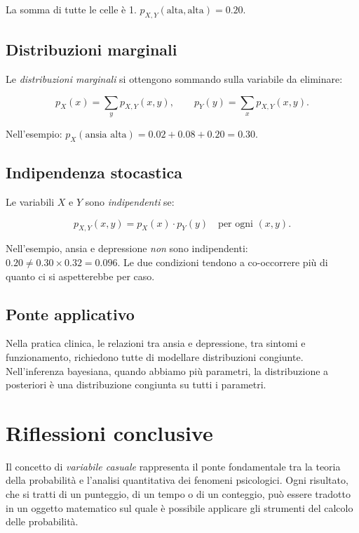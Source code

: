 \documentclass[
  italian,
  letterpaper,
  a4paper,
  11pt,
  open=any]{scrbook}
\theoremstyle{plain}
\theoremstyle{definition}
\theoremstyle{definition}
\theoremstyle{remark}
\begin{document}
La somma di tutte le celle è 1.
\(p_{X,Y}(\text{alta}, \text{alta}) = 0.20\).

\subsection{Distribuzioni marginali}\label{distribuzioni-marginali}

Le \emph{distribuzioni marginali} si ottengono sommando sulla variabile
da eliminare:

\[
p_X(x) = \sum_y p_{X,Y}(x,y), \qquad p_Y(y) = \sum_x p_{X,Y}(x,y).
\]

Nell'esempio: \(p_X(\text{ansia alta}) = 0.02 + 0.08 + 0.20 = 0.30\).

\subsection{Indipendenza stocastica}\label{indipendenza-stocastica}

Le variabili \(X\) e \(Y\) sono \emph{indipendenti} se:

\[
p_{X,Y}(x,y) = p_X(x) \cdot p_Y(y) \quad \text{per ogni } (x,y).
\]

Nell'esempio, ansia e depressione \emph{non} sono indipendenti:
\(0.20 \neq 0.30 \times 0.32 = 0.096\). Le due condizioni tendono a
co-occorrere più di quanto ci si aspetterebbe per caso.

\subsection{Ponte applicativo}\label{ponte-applicativo}

Nella pratica clinica, le relazioni tra ansia e depressione, tra sintomi
e funzionamento, richiedono tutte di modellare distribuzioni congiunte.
Nell'inferenza bayesiana, quando abbiamo più parametri, la distribuzione
a posteriori è una distribuzione congiunta su tutti i parametri.

\section*{Riflessioni conclusive}\label{riflessioni-conclusive-5}


Il concetto di \emph{variabile casuale} rappresenta il ponte
fondamentale tra la teoria della probabilità e l'analisi quantitativa
dei fenomeni psicologici. Ogni risultato, che si tratti di un punteggio,
di un tempo o di un conteggio, può essere tradotto in un oggetto
matematico sul quale è possibile applicare gli strumenti del calcolo
delle probabilità.
\end{document}

